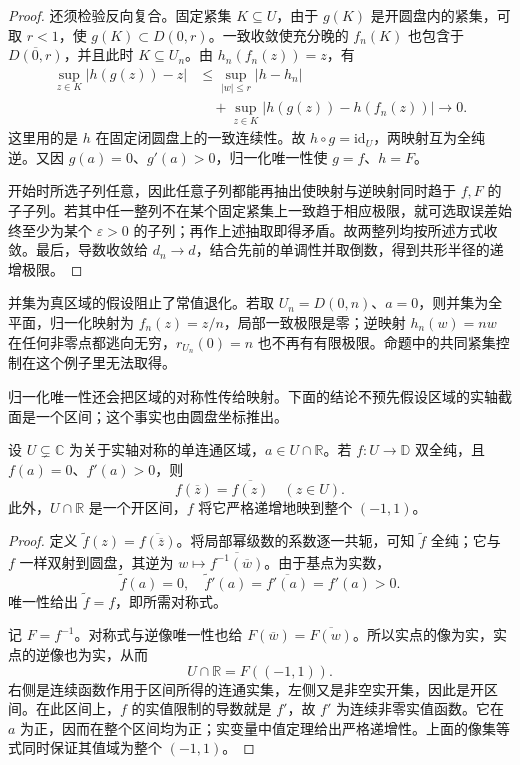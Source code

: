 \begin{proof}
还须检验反向复合。固定紧集 \(K\subseteq U\)，由于 \(g(K)\) 是开圆盘内的紧集，可取 \(r<1\)，使 \(g(K)\subset D(0,r)\)。一致收敛使充分晚的 \(f_n(K)\) 也包含于 \(\overline{D(0,r)}\)，并且此时 \(K\subseteq U_n\)。由 \(h_n(f_n(z))=z\)，有
\[
 \begin{aligned}
 \sup_{z\in K}|h(g(z))-z|
 &\le\sup_{|w|\le r}|h-h_n|\\
 &\quad+\sup_{z\in K}|h(g(z))-h(f_n(z))|
 \longrightarrow0.
 \end{aligned}
\]
这里用的是 \(h\) 在固定闭圆盘上的一致连续性。故 \(h\circ g=\mathrm{id}_U\)，两映射互为全纯逆。又因 \(g(a)=0\)、\(g'(a)>0\)，归一化唯一性使 \(g=f\)、\(h=F\)。

开始时所选子列任意，因此任意子列都能再抽出使映射与逆映射同时趋于 \(f,F\) 的子子列。若其中任一整列不在某个固定紧集上一致趋于相应极限，就可选取误差始终至少为某个 \(\varepsilon>0\) 的子列；再作上述抽取即得矛盾。故两整列均按所述方式收敛。最后，导数收敛给 \(d_n\rightarrow d\)，结合先前的单调性并取倒数，得到共形半径的递增极限。
\end{proof}

并集为真区域的假设阻止了常值退化。若取 \(U_n=D(0,n)\)、\(a=0\)，则并集为全平面，归一化映射为 \(f_n(z)=z/n\)，局部一致极限是零；逆映射 \(h_n(w)=nw\) 在任何非零点都逃向无穷，\(r_{U_n}(0)=n\) 也不再有有限极限。命题中的共同紧集控制在这个例子里无法取得。

\ProseParagraphBreak

归一化唯一性还会把区域的对称性传给映射。下面的结论不预先假设区域的实轴截面是一个区间；这个事实也由圆盘坐标推出。

\begin{proposition}[实轴对称]\label{b3:prop:05-real-symmetry}
设 \(U\subsetneq\mathbb C\) 为关于实轴对称的单连通区域，\(a\in U\cap\mathbb R\)。若 \(f:U\rightarrow\mathbb D\) 双全纯，且 \(f(a)=0\)、\(f'(a)>0\)，则
\[
 f(\overline z)=\overline{f(z)}\quad(z\in U).
\]
此外，\(U\cap\mathbb R\) 是一个开区间，\(f\) 将它严格递增地映到整个 \((-1,1)\)。
\end{proposition}
\begin{proof}
定义 \(\widetilde f(z)=\overline{f(\overline z)}\)。将局部幂级数的系数逐一共轭，可知 \(\widetilde f\) 全纯；它与 \(f\) 一样双射到圆盘，其逆为 \(w\mapsto\overline{f^{-1}(\overline w)}\)。由于基点为实数，
\[
 \widetilde f(a)=0,\quad
 \widetilde f'(a)=\overline{f'(a)}=f'(a)>0.
\]
唯一性给出 \(\widetilde f=f\)，即所需对称式。

记 \(F=f^{-1}\)。对称式与逆像唯一性也给 \(F(\overline w)=\overline{F(w)}\)。所以实点的像为实，实点的逆像也为实，从而
\[
 U\cap\mathbb R=F((-1,1)).
\]
右侧是连续函数作用于区间所得的连通实集，左侧又是非空实开集，因此是开区间。在此区间上，\(f\) 的实值限制的导数就是 \(f'\)，故 \(f'\) 为连续非零实值函数。它在 \(a\) 为正，因而在整个区间均为正；实变量中值定理给出严格递增性。上面的像集等式同时保证其值域为整个 \((-1,1)\)。
\end{proof}

